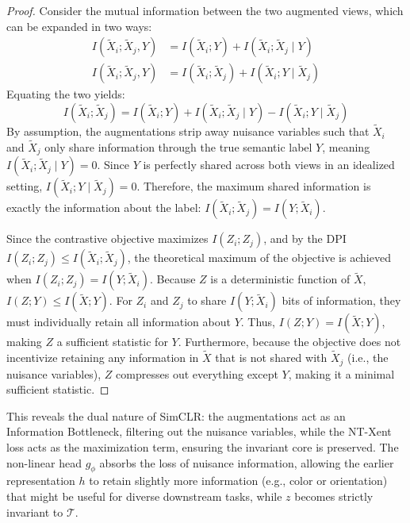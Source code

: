 \begin{proof}
Consider the mutual information between the two augmented views, which can be expanded in two ways:
\begin{align}
    I(\tilde{X}_i; \tilde{X}_j, Y) &= I(\tilde{X}_i; Y) + I(\tilde{X}_i; \tilde{X}_j \mid Y) \\
    I(\tilde{X}_i; \tilde{X}_j, Y) &= I(\tilde{X}_i; \tilde{X}_j) + I(\tilde{X}_i; Y \mid \tilde{X}_j)
\end{align}
Equating the two yields:
\begin{equation}
    I(\tilde{X}_i; \tilde{X}_j) = I(\tilde{X}_i; Y) + I(\tilde{X}_i; \tilde{X}_j \mid Y) - I(\tilde{X}_i; Y \mid \tilde{X}_j)
\end{equation}
By assumption, the augmentations strip away nuisance variables such that $\tilde{X}_i$ and $\tilde{X}_j$ only share information through the true semantic label $Y$, meaning $I(\tilde{X}_i; \tilde{X}_j \mid Y) = 0$. Since $Y$ is perfectly shared across both views in an idealized setting, $I(\tilde{X}_i; Y \mid \tilde{X}_j) = 0$. Therefore, the maximum shared information is exactly the information about the label: $I(\tilde{X}_i; \tilde{X}_j) = I(Y; \tilde{X}_i)$.

Since the contrastive objective maximizes $I(Z_i; Z_j)$, and by the DPI $I(Z_i; Z_j) \leq I(\tilde{X}_i; \tilde{X}_j)$, the theoretical maximum of the objective is achieved when $I(Z_i; Z_j) = I(Y; \tilde{X}_i)$. Because $Z$ is a deterministic function of $\tilde{X}$, $I(Z; Y) \leq I(\tilde{X}; Y)$. For $Z_i$ and $Z_j$ to share $I(Y; \tilde{X}_i)$ bits of information, they must individually retain all information about $Y$. Thus, $I(Z; Y) = I(\tilde{X}; Y)$, making $Z$ a sufficient statistic for $Y$. Furthermore, because the objective does not incentivize retaining any information in $\tilde{X}$ that is not shared with $\tilde{X}_j$ (i.e., the nuisance variables), $Z$ compresses out everything except $Y$, making it a minimal sufficient statistic.
\end{proof}

This reveals the dual nature of SimCLR: the augmentations act as an Information Bottleneck, filtering out the nuisance variables, while the NT-Xent loss acts as the maximization term, ensuring the invariant core is preserved. The non-linear head $g_\phi$ absorbs the loss of nuisance information, allowing the earlier representation $h$ to retain slightly more information (e.g., color or orientation) that might be useful for diverse downstream tasks, while $z$ becomes strictly invariant to $\mathcal{T}$.

